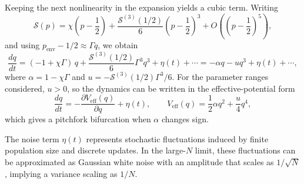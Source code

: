 Keeping the next nonlinearity in the expansion yields a cubic term. Writing
\begin{equation}
\mathcal{S}(p)=\chi\left(p-\frac{1}{2}\right)+\frac{\mathcal{S}^{(3)}(1/2)}{6}\left(p-\frac{1}{2}\right)^3+O\!\left(\left(p-\frac{1}{2}\right)^5\right),
\end{equation}
and using $p_{\text{env}}-1/2\approx \Gamma q$, we obtain
\begin{equation}
\frac{dq}{dt}=(-1+\chi\Gamma)\,q+\frac{\mathcal{S}^{(3)}(1/2)}{6}\Gamma^3 q^3+\eta(t)+\cdots
=-\alpha q-u q^3+\eta(t)+\cdots,
\end{equation}
where $\alpha=1-\chi\Gamma$ and $u=-\mathcal{S}^{(3)}(1/2)\Gamma^3/6$. For the parameter ranges considered, $u>0$, so the dynamics can be written in the effective-potential form
\begin{equation}
\frac{dq}{dt}=-\frac{\partial V_{\text{eff}}(q)}{\partial q}+\eta(t),\qquad
V_{\text{eff}}(q)=\frac{1}{2}\alpha q^2+\frac{u}{4}q^4,
\end{equation}
which gives a pitchfork bifurcation when $\alpha$ changes sign.

The noise term $\eta(t)$ represents stochastic fluctuations induced by finite population size and discrete updates. In the large-$N$ limit, these fluctuations can be approximated as Gaussian white noise with an amplitude that scales as $1/\sqrt{N}$, implying a variance scaling as $1/N$.

